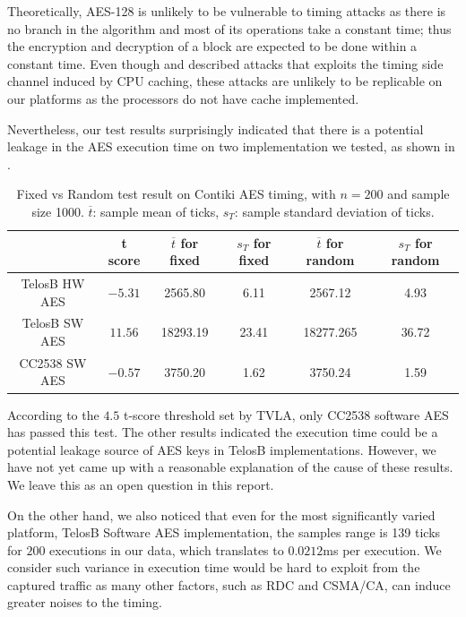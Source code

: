 Theoretically, AES-128 is unlikely to be vulnerable to timing attacks as there is no branch in the algorithm and most of its operations take a constant time; thus the encryption and decryption of a block are expected to be done within a constant time. Even though \cite{Cache-Timing1} and \cite{Cache-Timing2} described attacks that exploits the timing side channel induced by CPU caching, these attacks are unlikely to be replicable on our platforms as the processors do not have cache implemented. 

Nevertheless, our test results surprisingly indicated that there is a potential leakage in the AES execution time on two implementation we tested, as shown in .

\begin{table}[ht!]
	\centering
	\begin{tabular}{|c|c|c|c|c|c|}
		\hline
		              & t score           & $\overline{t}$ for fixed & $s_{T}$ for fixed & $\overline{t}$ for random & $s_{T}$ for random\\ \hline
		TelosB HW AES & $-5.31 $ & 2565.80     & 6.11      & 2567.12      & 4.93       \\ \hline
		TelosB SW AES & $11.56$ & 18293.19    & 23.41     & 18277.265   & 36.72      \\ \hline
		CC2538 SW AES & $-0.57$ & 3750.20    & 1.62      & 3750.24     & 1.59       \\ \hline
	\end{tabular}
	\caption{Fixed vs Random test result on Contiki AES timing, with $n=200$ and sample size 1000. $\overline{t}$: sample mean of ticks, $s_{T}$: sample standard deviation of ticks.}
	\label{Tbl: Fixed vs Random test on Contiki AES timing}
\end{table}

According to the $4.5$ t-score threshold set by TVLA, only CC2538 software AES has passed this test. The other results indicated the execution time could be a potential leakage source of AES keys in TelosB implementations. However, we have not yet came up with a reasonable explanation of the cause of these results. We leave this as an open question in this report.

On the other hand, we also noticed that even for the most significantly varied platform, TelosB Software AES implementation, the samples range is 139 ticks for $200$ executions in our data, which translates to $0.0212$ms per execution. We consider such variance in execution time would be hard to exploit from the captured traffic as many other factors, such as  RDC and CSMA/CA, can induce greater noises to the timing.

